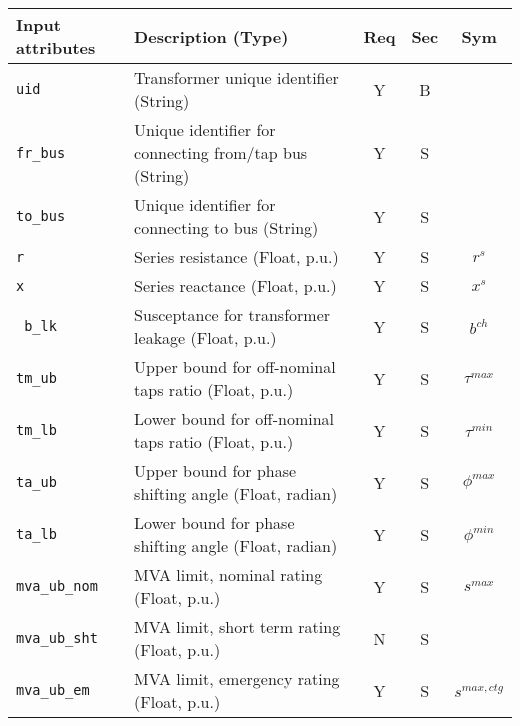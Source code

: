 \documentclass{article}
\begin{document}
\begin{center}
\small
\begin{tabular}{ l | l | c | c | c |}
Input attributes & Description (Type) & Req & Sec & Sym\\
\hline
  {\tt uid} & Transformer unique identifier (String)& Y & B & \\
  {\tt fr\_bus} & Unique identifier for connecting from/tap bus (String)& Y & S & \\
  {\tt to\_bus} & Unique identifier for connecting to bus (String)& Y & S & \\
  {\tt r} & Series resistance (Float, p.u.)& Y & S & $r^{s}$\\
  {\tt x} & Series reactance  (Float, p.u.)& Y & S & $x^{s}$\\
  {\tt\color{red} b\_lk} & Susceptance for transformer leakage (Float, p.u.)& Y & S & $b^{ch}$ \\
  {\tt tm\_ub} & Upper bound for off-nominal taps ratio (Float, p.u.)& Y & S & $\tau^{max}$\\
  {\tt tm\_lb} & Lower bound for off-nominal taps ratio (Float, p.u.)& Y & S & $\tau^{min}$\\
  {\tt ta\_ub} & Upper bound for phase shifting angle (Float, radian)& Y & S & $\phi^{max}$\\
  {\tt ta\_lb} & Lower bound for phase shifting angle (Float, radian)& Y & S & $\phi^{min}$\\
  {\tt mva\_ub\_nom} & MVA limit, nominal rating (Float, p.u.) & Y & S & $s^{max}$ \\
  {\tt mva\_ub\_sht} & MVA limit, short term rating (Float, p.u.) & N & S &  \\
  {\tt mva\_ub\_em} & MVA limit, emergency rating (Float, p.u.) & Y & S & $s^{max,ctg}$ \\
 

\end{tabular}
\end{center}
\end{document}
